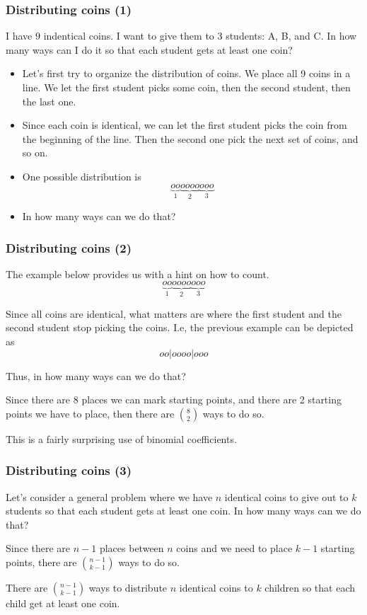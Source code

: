 \begin{frame}\frametitle{Distributing coins (1)}
  \begin{tcolorbox}
    I have $9$ indentical coins.  I want to give them to $3$ students:
    A, B, and C.  In how many ways can I do it so that each student
    gets at least one coin?
  \end{tcolorbox}

  \begin{itemize}
  \item Let's first try to organize the distribution of coins.  \pause
    We place all 9 coins in a line.  We let the first student picks
    some coin, then the second student, then the last one. \pause
  \item Since each coin is identical, we can let the first student
    picks the coin from the beginning of the line.  Then the second
    one pick the next set of coins, and so on. \pause
  \item One possible distribution is
    \[
    \underbrace{o o}_{1} \underbrace{o o o o}_{2} \underbrace{o o o}_{3}
    \]
    \pause
  \item In how many ways can we do that?
  \end{itemize}
\end{frame}

\begin{frame}\frametitle{Distributing coins (2)}
  The example below provides us with a hint on how to count.
  \[
  \underbrace{o o}_{1} \underbrace{o o o o}_{2} \underbrace{o o o}_{3}
  \]
  \pause

  Since all coins are identical, what matters are where the first
  student and the second student stop picking the coins. \pause
  I.e, the previous example can be depicted as
  \[
  o o | o o o o | o o o
  \]

  Thus, in how many ways can we do that? \pause
  
  Since there are 8 places we can mark starting points, and
  there are 2 starting points we have to place, then there are
  $\binom{8}{2}$ ways to do so. \pause

  This is a fairly surprising use of binomial coefficients.
\end{frame}

\begin{frame}\frametitle{Distributing coins (3)}
  Let's consider a general problem where we have $n$ identical coins
  to give out to $k$ students so that each student gets at least one
  coin.  In how many ways can we do that?

  \pause Since there are $n-1$ places between $n$ coins and we need to
  place $k-1$ starting points, there are $\binom{n-1}{k-1}$ ways to do
  so.

  \pause
  \begin{tcolorbox}
    There are $\binom{n-1}{k-1}$ ways to distribute $n$ identical
    coins to $k$ children so that each child get at least one coin.
  \end{tcolorbox}
\end{frame}

